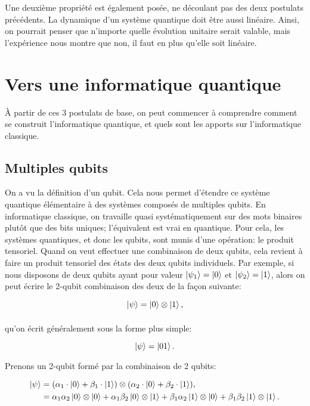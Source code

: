Une deuxième propriété est également posée, ne découlant pas des deux postulats précédents. La dynamique d'un système quantique doit être aussi linéaire. Ainsi, on pourrait penser que n'importe quelle évolution unitaire serait valable, mais l'expérience nous montre que non, il faut en plus qu'elle soit linéaire.

\section{Vers une informatique quantique}
\`A partir de ces 3 postulats de base, on peut commencer à comprendre comment se construit l'informatique quantique, et quels sont les apports sur l'informatique classique.

\subsection{Multiples qubits}
On a vu la définition d'un qubit. Cela nous permet d'étendre ce système quantique élémentaire à des systèmes composés de multiples qubits. En informatique classique, on travaille quasi systématiquement sur des mots binaires plutôt que des bits uniques; l'équivalent est vrai en quantique. Pour cela, les systèmes quantiques, et donc les qubits, sont munis d'une opération: le produit tensoriel. Quand on veut effectuer une combinaison de deux qubits, cela revient à faire un produit tensoriel des états des deux qubits individuels. Par exemple, si nous disposons de deux qubits ayant pour valeur $\ket{\psi_1} = \ket{0}$ et $\ket{\psi_2} = \ket{1}$, alors on peut écrire le 2-qubit combinaison des deux de la façon suivante:


\begin{equation}
    \ket{\psi} = \ket{0} \mathbin{\mathop{\otimes}\limits_{}} \ket{1},
\end{equation}

qu'on écrit généralement sous la forme plus simple:

\begin{equation}
    \ket{\psi} = \ket{01}.
\end{equation}

Prenons un 2-qubit formé par la combinaison de 2 qubits:

\begin{align*}
\ket{\psi} &= (\alpha_1\cdot\ket{0} + \beta_1\cdot\ket{1}) \otimes (\alpha_2\cdot\ket{0} + \beta_2\cdot\ket{1}) ,\\
&= \alpha_1\alpha_2 \ket{0} \otimes \ket{0} + \alpha_1\beta_2 \ket{0} \otimes \ket{1} + \beta_1\alpha_2 \ket{1} \otimes \ket{0} + \beta_1\beta_2 \ket{1} \otimes \ket{1}.
\end{align*}

